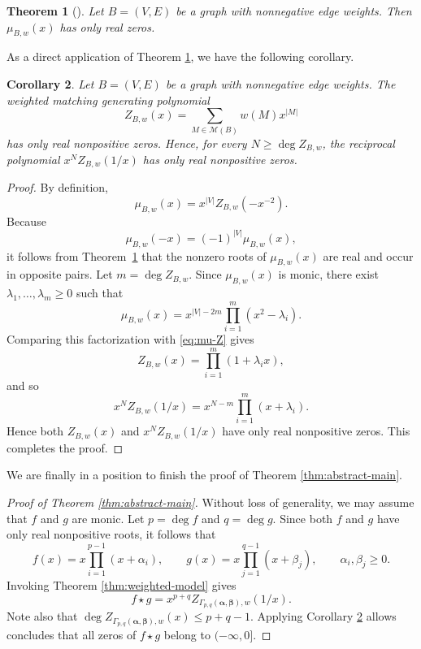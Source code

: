 \documentclass[12pt,a4paper,reqno]{amsart}
\numberwithin{equation}{section}
\newtheorem{theorem}{Theorem}[section]
\newtheorem{corollary}[theorem]{Corollary}
\theoremstyle{definition}
\theoremstyle{remark}
\newcommand{\Match}{\mathcal M}
\begin{document}
\begin{theorem}[{\cite[Theorem 4.2]{HL72}}]
\label{thm:heilmann-lieb}
Let $B=(V,E)$ be a   graph with nonnegative edge weights.
Then $\mu_{B,w}(x)$ has only real zeros.
\end{theorem}

As a direct application  of Theorem 
\ref{thm:heilmann-lieb}, we have the following corollary. 

\begin{corollary}\label{cor:matching-generating}
Let $B=(V,E)$ be a   graph with nonnegative edge weights.
The weighted matching generating polynomial
\begin{equation*}
 Z_{B,w}(x)=\sum_{M\in\Match(B)}w(M)x^{|M|}
\end{equation*}
has only real nonpositive zeros.  Hence, for every
$N\geq\deg Z_{B,w}$, the reciprocal polynomial
$x^NZ_{B,w}(1/x)$ has only real nonpositive zeros.
\end{corollary}

\begin{proof}
By definition, 
\begin{equation}\label{eq:mu-Z}
 \mu_{B,w}(x)=x^{|V|}Z_{B,w}(-x^{-2}).
\end{equation} 
Because 
\[
\mu_{B,w}(-x)=(-1)^{|V|}\mu_{B,w}(x),
\]
it follows from 
Theorem~\ref{thm:heilmann-lieb} that the  nonzero roots of $\mu_{B,w}(x)$ are real and occur in
opposite pairs.  Let $m=\deg Z_{B,w}$.   Since $\mu_{B,w}(x)$ is monic, there exist
$\lambda_1,\ldots,\lambda_m\geq0$ such that
\[
 \mu_{B,w}(x)=x^{|V|-2m}\prod_{i=1}^{m}(x^2-\lambda_i).
\]
Comparing this factorization with \eqref{eq:mu-Z} gives
\[
 Z_{B,w}(x)=\prod_{i=1}^{m}(1+\lambda_i x),
 \]
 and so
\[
 x^NZ_{B,w}(1/x)=x^{N-m}\prod_{i=1}^{m}(x+\lambda_i).
\]
Hence both $ Z_{B,w}(x)$ and $x^NZ_{B,w}(1/x)$ have only real nonpositive zeros. This completes  the proof. 
\end{proof}

We are finally in a position to finish the proof of Theorem \ref{thm:abstract-main}. 

\begin{proof}[Proof of Theorem \ref{thm:abstract-main}]
Without loss of generality, we may  assume that $f$ and $g$
are monic.  Let $p=\deg f$ and $q=\deg g$. Since both $f$ and $g$ have only real nonpositive roots, it follows that 
\[
 f(x)=x\prod_{i=1}^{p-1}(x+\alpha_i),\qquad
 g(x)=x\prod_{j=1}^{q-1}(x+\beta_j),
 \qquad \alpha_i,\beta_j\geq0.
\]
Invoking  Theorem \ref{thm:weighted-model} gives  
\begin{equation*}
 f\star g=x^{p+q}
 Z_{\Gamma_{p,q}(\boldsymbol\alpha,\boldsymbol\beta),w}(1/x).
\end{equation*}
Note also that 
$\deg Z_{\Gamma_{p,q}(\boldsymbol\alpha,\boldsymbol\beta),w}(x)\leq p+q-1$.
Applying 
Corollary \ref{cor:matching-generating} allows concludes  that  all zeros of $f\star g$ belong to  $(-\infty,0]$.
\end{proof}
\end{document}
